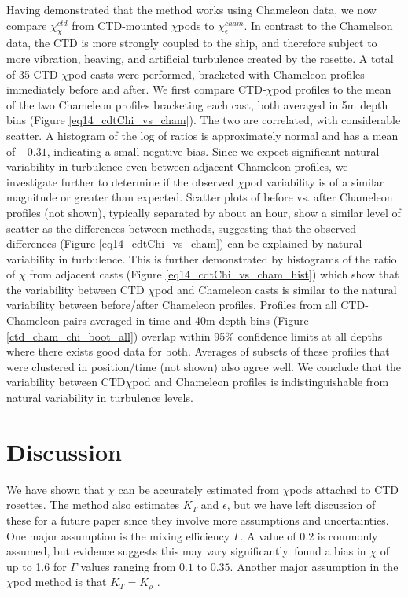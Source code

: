 \documentclass{ametsoc}
\begin{document}
Having demonstrated that the method works using Chameleon data, we now compare $\chi_{\chi}^{ctd}$ from CTD-mounted $\chi$pods to $\chi_{\epsilon}^{cham}$. In contrast to the Chameleon data, the CTD is more strongly coupled to the ship, and therefore subject to more vibration, heaving, and artificial turbulence created by the rosette. A total of 35 CTD-$\chi$pod casts were performed, bracketed with Chameleon profiles immediately before and after. We first compare CTD-$\chi$pod profiles to the mean of the two Chameleon profiles bracketing each cast, both averaged in 5m depth bins (Figure \ref{eq14_cdtChi_vs_cham}). The two are correlated, with considerable scatter. A histogram of the log of ratios is approximately normal and has a mean of $-0.31$, indicating a small negative bias. Since we expect significant natural variability in turbulence even between adjacent Chameleon profiles, we investigate further to determine if the observed $\chi$pod variability is of a similar magnitude or greater than expected. Scatter plots of before vs. after Chameleon profiles (not shown), typically separated by about an hour, show a similar level of scatter as the differences between methods, suggesting that the observed differences (Figure \ref{eq14_cdtChi_vs_cham}) can be explained by natural variability in turbulence. This is further demonstrated by histograms of the ratio of $\chi$ from adjacent casts (Figure \ref{eq14_cdtChi_vs_cham_hist}) which show that the variability between CTD $\chi$pod and Chameleon casts is similar to the natural variability between before/after Chameleon profiles. Profiles from all CTD-Chameleon pairs averaged in time and 40m depth bins (Figure \ref{ctd_cham_chi_boot_all}) overlap within 95\% confidence limits at all depths where there exists good data for both. Averages of subsets of these profiles that were clustered in position/time (not shown) also agree well. We conclude that the variability between CTD$\chi$pod and Chameleon profiles is indistinguishable from natural variability in turbulence levels.


\section{Discussion}

We have shown that $\chi$ can be accurately estimated from $\chi$pods attached to CTD rosettes. The method also estimates $K_T$ and $\epsilon$, but we have left discussion of these for a future paper since they involve more assumptions and uncertainties. One major assumption is the mixing efficiency $\Gamma$. A value of $0.2$ is commonly assumed, but evidence suggests this may vary significantly. \cite{moumnash09} found a bias in $\chi$ of up to 1.6 for $\Gamma$ values ranging from $0.1$ to $0.35$.  Another major assumption in the $\chi$pod method is that $K_T=K_{\rho}$ \citep{moum96b}. 
\end{document}
